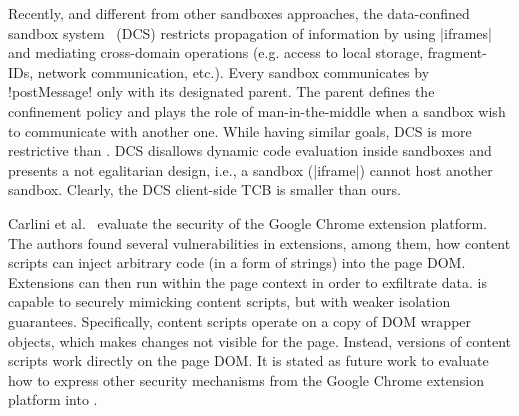 Recently, and different from other sandboxes approaches, the data-confined
sandbox system~\cite{Akhawe2013} (DCS) restricts propagation of information by using
\js|iframes| and mediating cross-domain operations (e.g. access to local
storage, fragment-IDs, network communication, etc.).  Every sandbox communicates
by \js!postMessage! only with its designated parent. The parent defines the
confinement policy and plays the role of man-in-the-middle when a sandbox wish
to communicate with another one. While having similar goals, DCS is more
restrictive than \sys. DCS disallows dynamic code evaluation inside sandboxes
and presents a not egalitarian design, i.e., a sandbox (\js|iframe|) cannot host
another sandbox. Clearly, the DCS client-side TCB is smaller than ours.


Carlini et al.~\cite{Carlini:2012} evaluate the security of the Google Chrome
extension platform. The authors found several vulnerabilities in extensions, among them,
how content scripts can inject arbitrary code (in a form of strings) into the
page DOM. Extensions can then run within the page context in order
to exfiltrate data. \sys{} is capable to securely mimicking content scripts, but
with  weaker isolation guarantees.  Specifically, content scripts operate on a
copy of DOM wrapper objects, which makes changes not visible for the
page. Instead, \sys{} versions of content scripts work directly on the page DOM.
It is stated as future work to evaluate how to express other 
security mechanisms from the Google Chrome extension platform into \sys{}. 

 
 

